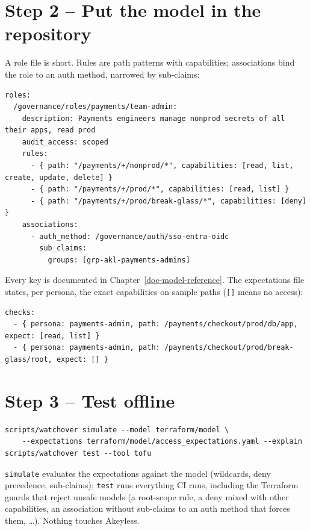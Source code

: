 \section{Step 2 -- Put the model in the repository}
A role file is short. Rules are path patterns with capabilities; associations bind the role to an
auth method, narrowed by sub-claims:
\begin{lstlisting}
roles:
  /governance/roles/payments/team-admin:
    description: Payments engineers manage nonprod secrets of all their apps, read prod
    audit_access: scoped
    rules:
      - { path: "/payments/+/nonprod/*", capabilities: [read, list, create, update, delete] }
      - { path: "/payments/+/prod/*", capabilities: [read, list] }
      - { path: "/payments/+/prod/break-glass/*", capabilities: [deny] }
    associations:
      - auth_method: /governance/auth/sso-entra-oidc
        sub_claims:
          groups: [grp-akl-payments-admins]
\end{lstlisting}
Every key is documented in Chapter~\ref{doc-model-reference}. The expectations file states, per
persona, the exact capabilities on sample paths (\texttt{[]} means no access):
\begin{lstlisting}
checks:
  - { persona: payments-admin, path: /payments/checkout/prod/db/app,           expect: [read, list] }
  - { persona: payments-admin, path: /payments/checkout/prod/break-glass/root, expect: [] }
\end{lstlisting}

\section{Step 3 -- Test offline}
\begin{lstlisting}
scripts/watchover simulate --model terraform/model \
    --expectations terraform/model/access_expectations.yaml --explain
scripts/watchover test --tool tofu
\end{lstlisting}
\texttt{simulate} evaluates the expectations against the model (wildcards, deny precedence,
sub-claims); \texttt{test} runs everything CI runs, including the Terraform guards that reject
unsafe models (a root-scope rule, a deny mixed with other capabilities, an association without
sub-claims to an auth method that forces them, \ldots). Nothing touches Akeyless.

